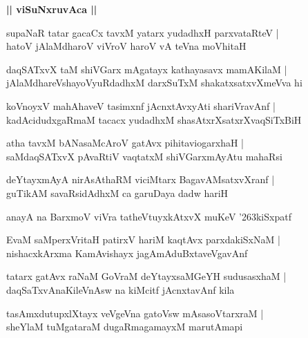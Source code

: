 \documentclass[twoside,12pt,openright]{book}
\def\S{\char'263}
\newcounter{shloka}[chapter]
\def\uvaca#1{\centerline{{\large\textbf{#1}}}}
\begin{document}
\uvaca{|| viSuNxruvAca ||}

\begin{shloka}%
supaNaR tatar gacaCx tavxM yatarx yudadhxH parxvataRteV |\\
hatoV jAlaMdharoV viVroV haroV vA teVna moVhitaH 
\end{shloka}

\begin{shloka}%
daqSATxvX taM shiVGarx mAgatayx kathayasavx mamAKilaM |\\
jAlaMdhareVshayoVyuRdadhxM darxSuTxM shakatxsatxvXmeVva hi
\end{shloka}

\begin{shloka}%
koVnoyxV mahAhaveV tasimxnf jAcnxtAvxyAti shariVravAnf |\\
kadAcidudxgaRmaM tacacx yudadhxM shasAtxrXsatxrXvaqSiTxBiH
\end{shloka}

\begin{shloka}%
atha tavxM bANasaMcAroV gatAvx pihitaviogarxhaH |\\
saMdaqSATxvX pAvaRtiV vaqtatxM shiVGarxmAyAtu mahaRsi 
\end{shloka}

\begin{shloka}%
deYtayxmAyA nirAsAthaRM viciMtarx BagavAMsatxvXranf |\\
guTikAM savaRsidAdhxM ca garuDaya dadw hariH 
\end{shloka}

\begin{shloka}%
anayA na BarxmoV viVra tatheVtuyxkAtxvX muKeV \S kiSxpatf 
\end{shloka}

\begin{shloka}%
EvaM saMperxVritaH patirxV hariM kaqtAvx parxdakiSxNaM |\\
nishacxkArxma KamAvishayx jagAmAduBxtaveVgavAnf 
\end{shloka}

\begin{shloka}%
tatarx gatAvx raNaM GoVraM deYtayxsaMGeYH sudusasxhaM |\\
daqSaTxvAnaKileVnAsw na kiMcitf jAcnxtavAnf kila 
\end{shloka}

\begin{shloka}%
tasAmxdutupxlXtayx veVgeVna gatoVsw mAsasoVtarxraM |\\
sheYlaM tuMgataraM dugaRmagamayxM marutAmapi
\end{shloka}
\end{document}
